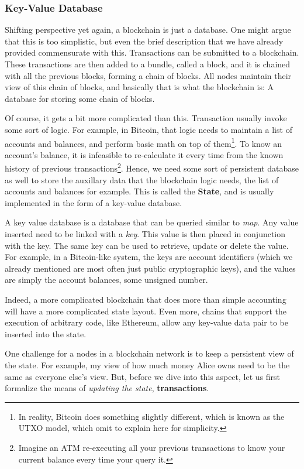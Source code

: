 \subsubsection{Key-Value Database} \label{chap_bg:subsec:kvdb}

Shifting perspective yet again, a blockchain is just a database. One might argue that this is too
simplistic, but even the brief description that we have already provided commensurate with this.
Transactions can be submitted to a blockchain. These transactions are then added to a bundle, called
a block, and it is chained with all the previous blocks, forming a chain of blocks. All nodes
maintain their view of this chain of blocks, and basically that is what the blockchain is: A
database for storing some chain of blocks.

Of course, it gets a bit more complicated than this. Transaction usually invoke some sort of logic.
For example, in Bitcoin, that logic needs to maintain a list of accounts and balances, and perform
basic math on top of them\footnote{In reality, Bitcoin does something slightly different, which is
known as the UTXO model, which omit to explain here for simplicity.}. To know an account's balance,
it is infeasible to re-calculate it every time from the known history of previous
transactions\footnote{Imagine an ATM re-executing all your previous transactions to know your
current balance every time your query it.}. Hence, we need some sort of persistent database as well
to store the auxillary data that the blockchain logic needs, the list of accounts and balances for
example. This is called the \textbf{State}, and is usually implemented in the form of a key-value
database.

A key value database is a database that can be queried similar to \textit{map}. Any value inserted
need to be linked with a \textit{key}. This value is then placed in conjunction with the key. The
same key can be used to retrieve, update or delete the value. For example, in a Bitcoin-like system,
the keys are account identifiers (which we already mentioned are most often just public
cryptographic keys), and the values are simply the account balances, some unsigned number.

Indeed, a more complicated blockchain that does more than simple accounting will have a more
complicated state layout. Even more, chains that support the execution of arbitrary code, like
Ethereum, allow any key-value data pair to be inserted into the state.

One challenge for a nodes in a blockchain network is to keep a persistent view of the state. For
example, my view of how much money Alice owns need to be the same as everyone else's view. But,
before we dive into this aspect, let us first formalize the means of \textit{updating the state},
\textbf{transactions}.


